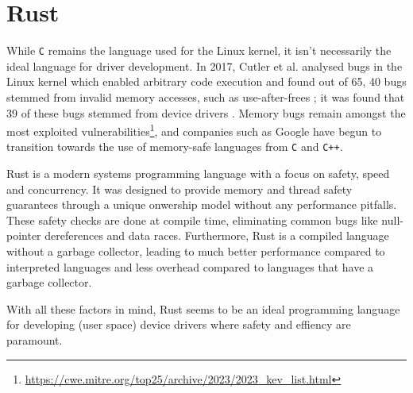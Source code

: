 
\section{Rust}
While \texttt{C} remains the language used for the Linux kernel, it isn't necessarily the ideal language for driver development. In 2017, Cutler et al. analysed bugs in the Linux kernel which enabled arbitrary code execution and found out of 65, 40 bugs stemmed from invalid memory accesses, such as use-after-frees \cite{cutler}; it was found that 39 of these bugs stemmed from device drivers \cite{driver_lang}. Memory bugs remain amongst the most exploited vulnerabilities\footnote{\url{https://cwe.mitre.org/top25/archive/2023/2023_kev_list.html}}, and companies such as Google have begun to transition towards the use of memory-safe languages from \texttt{C} and \texttt{C++}.

Rust is a modern systems programming language with a focus on safety, speed and concurrency. It was designed to provide memory and thread safety guarantees through a unique onwership model without any performance pitfalls. These safety checks are done at compile time, eliminating common bugs like null-pointer dereferences and data races. Furthermore, Rust is a compiled language without a garbage collector, leading to much better performance compared to interpreted languages and less overhead compared to languages that have a garbage collector.

With all these factors in mind, Rust seems to be an ideal programming language for developing (user space) device drivers where safety and effiency are paramount.
